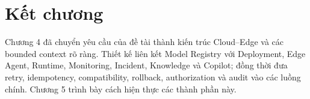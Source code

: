 \section{Kết chương}

Chương 4 đã chuyển yêu cầu của đề tài thành kiến trúc Cloud--Edge và các bounded
context rõ ràng. Thiết kế liên kết Model Registry với Deployment, Edge Agent,
Runtime, Monitoring, Incident, Knowledge và Copilot; đồng thời đưa retry,
idempotency, compatibility, rollback, authorization và audit vào các luồng chính.
Chương 5 trình bày cách hiện thực các thành phần này.